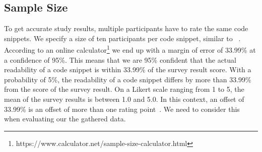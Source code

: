 \documentclass[%
class=scrreprt,
chapterprefix=false,%
open=right,%
twoside=false,%
paper=a4,%
logofile={Logo\_zentral\_farbig\_EN.png},%
thesistype=masterproposal,%
UKenglish,%
]{se2thesis}
\begin{document}
\subsection{Sample Size}
To get accurate study results, multiple participants have to rate the same code snippets. We specify a size of ten participants per code snippet, similar to \citeauthor{scalabrino2016improving}~\cite{scalabrino2016improving}. According to an online calculator\footnote{https://www.calculator.net/sample-size-calculator.html} we end up with a margin of error of 33.99\% at a confidence of 95\%. This means that we are 95\% confident that the actual readability of a code snippet is within 33.99\% of the survey result score. With a probability of 5\%, the readability of a code snippet differs by more than 33.99\% from the score of the survey result. On a Likert scale ranging from 1 to 5, the mean of the survey results is between 1.0 and 5.0. In this context, an offset of 33.99\% is an offset of more than one rating point~\cite{likert1932technique}. We need to consider this when evaluating our the gathered data.




\end{document}
